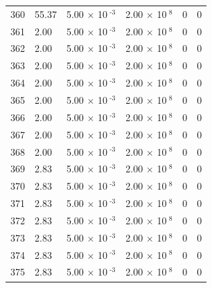 \documentclass[a4paper,11pt]{article}
\begin{document}
\begin{center}
\begin{longtable}{|R{1.5cm}|R{2.4cm}|R{2.4cm}|R{2.4cm}|R{2.4cm}|R{2.4cm}|}
  360 &  55.37  &         5.00 $\times$ 10$^{\text{          -3}}$  &         2.00 $\times$ 10$^{\text{           8}}$  & 0  & 0 \\
  361 &   2.00  &         5.00 $\times$ 10$^{\text{          -3}}$  &         2.00 $\times$ 10$^{\text{           8}}$  & 0  & 0 \\
  362 &   2.00  &         5.00 $\times$ 10$^{\text{          -3}}$  &         2.00 $\times$ 10$^{\text{           8}}$  & 0  & 0 \\
  363 &   2.00  &         5.00 $\times$ 10$^{\text{          -3}}$  &         2.00 $\times$ 10$^{\text{           8}}$  & 0  & 0 \\
  364 &   2.00  &         5.00 $\times$ 10$^{\text{          -3}}$  &         2.00 $\times$ 10$^{\text{           8}}$  & 0  & 0 \\
  365 &   2.00  &         5.00 $\times$ 10$^{\text{          -3}}$  &         2.00 $\times$ 10$^{\text{           8}}$  & 0  & 0 \\
  366 &   2.00  &         5.00 $\times$ 10$^{\text{          -3}}$  &         2.00 $\times$ 10$^{\text{           8}}$  & 0  & 0 \\
  367 &   2.00  &         5.00 $\times$ 10$^{\text{          -3}}$  &         2.00 $\times$ 10$^{\text{           8}}$  & 0  & 0 \\
  368 &   2.00  &         5.00 $\times$ 10$^{\text{          -3}}$  &         2.00 $\times$ 10$^{\text{           8}}$  & 0  & 0 \\
  369 &   2.83  &         5.00 $\times$ 10$^{\text{          -3}}$  &         2.00 $\times$ 10$^{\text{           8}}$  & 0  & 0 \\
  370 &   2.83  &         5.00 $\times$ 10$^{\text{          -3}}$  &         2.00 $\times$ 10$^{\text{           8}}$  & 0  & 0 \\
  371 &   2.83  &         5.00 $\times$ 10$^{\text{          -3}}$  &         2.00 $\times$ 10$^{\text{           8}}$  & 0  & 0 \\
  372 &   2.83  &         5.00 $\times$ 10$^{\text{          -3}}$  &         2.00 $\times$ 10$^{\text{           8}}$  & 0  & 0 \\
  373 &   2.83  &         5.00 $\times$ 10$^{\text{          -3}}$  &         2.00 $\times$ 10$^{\text{           8}}$  & 0  & 0 \\
  374 &   2.83  &         5.00 $\times$ 10$^{\text{          -3}}$  &         2.00 $\times$ 10$^{\text{           8}}$  & 0  & 0 \\
  375 &   2.83  &         5.00 $\times$ 10$^{\text{          -3}}$  &         2.00 $\times$ 10$^{\text{           8}}$  & 0  & 0 \\

\end{longtable}
\end{center}
\end{document}
